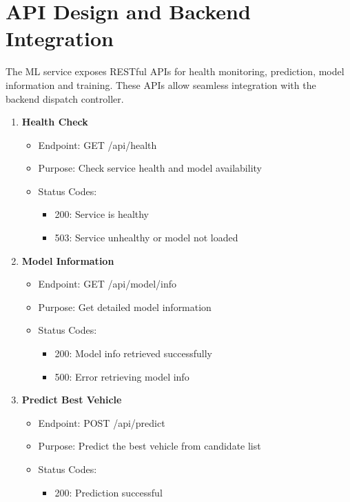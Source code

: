 \section{API Design and Backend Integration}
The ML service exposes RESTful APIs for health monitoring, prediction, model information and training. These APIs allow seamless integration with the backend dispatch controller.
\begin{enumerate}
    \item \textbf{Health Check} \\
    \begin{itemize}
        \item Endpoint: GET /api/health
        \item Purpose: Check service health and model availability
        \item Status Codes:
        \begin{itemize}
            \item 200: Service is healthy
            \item 503: Service unhealthy or model not loaded
        \end{itemize}
    \end{itemize}
    \item \textbf{Model Information} \\
    \begin{itemize}
        \item Endpoint: GET /api/model/info
        \item Purpose: Get detailed model information
        \item Status Codes:
        \begin{itemize}
            \item 200: Model info retrieved successfully
            \item 500: Error retrieving model info
        \end{itemize}
    \end{itemize}
    \item \textbf{Predict Best Vehicle} \\
    \begin{itemize}
        \item Endpoint: POST /api/predict
        \item Purpose: Predict the best vehicle from candidate list
        \item Status Codes:
        \begin{itemize}
            \item 200: Prediction successful

\end{itemize}
\end{itemize}
\end{enumerate}
